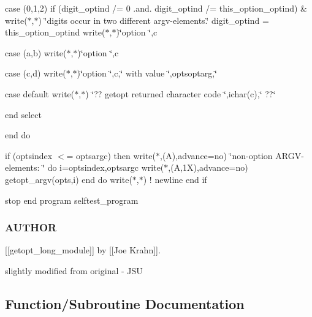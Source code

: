 case (\textquotesingle{}0\textquotesingle{},\textquotesingle{}1\textquotesingle{},\textquotesingle{}2\textquotesingle{}) if (digit\+\_\+optind /= 0 .and. digit\+\_\+optind /= this\+\_\+option\+\_\+optind) \& write($\ast$,$\ast$) \char`\"{}digits occur in two different argv-\/elements.\char`\"{} digit\+\_\+optind = this\+\_\+option\+\_\+optind write($\ast$,$\ast$)\char`\"{}option \char`\"{},c

case (\textquotesingle{}a\textquotesingle{},\textquotesingle{}b\textquotesingle{}) write($\ast$,$\ast$)\char`\"{}option \char`\"{},c

case (\textquotesingle{}c\textquotesingle{},\textquotesingle{}d\textquotesingle{}) write($\ast$,$\ast$)\char`\"{}option \char`\"{},c,\char`\"{} with value \textquotesingle{}\char`\"{},optsoptarg,\textquotesingle{}\char`\"{}\textquotesingle{}

case default write($\ast$,$\ast$) \char`\"{}?? getopt returned character code \char`\"{},ichar(c),\char`\"{} ??\char`\"{}

end select

end do

if (optsindex $<$= optsargc) then write($\ast$,\textquotesingle{}(A)\textquotesingle{},advance=\textquotesingle{}no\textquotesingle{}) \char`\"{}non-\/option A\+R\+G\+V-\/elements\+: \char`\"{} do i=optsindex,optsargc write($\ast$,\textquotesingle{}(A,1X)\textquotesingle{},advance=\textquotesingle{}no\textquotesingle{}) getopt\+\_\+argv(opts,i) end do write($\ast$,$\ast$) ! newline end if

stop end program selftest\+\_\+program \subsubsection*{A\+U\+T\+H\+OR}


\begin{DoxyItemize}
\item \mbox{[}\mbox{[}getopt\+\_\+long\+\_\+module\mbox{]}\mbox{]} by \mbox{[}\mbox{[}Joe Krahn\mbox{]}\mbox{]}.
\item slightly modified from original -\/ J\+SU 
\end{DoxyItemize}

\subsection{Function/\+Subroutine Documentation}
\mbox{\label{namespacem__getopt__long_ae12838b4ea1d076090a8bbd9f05000ef}} 
